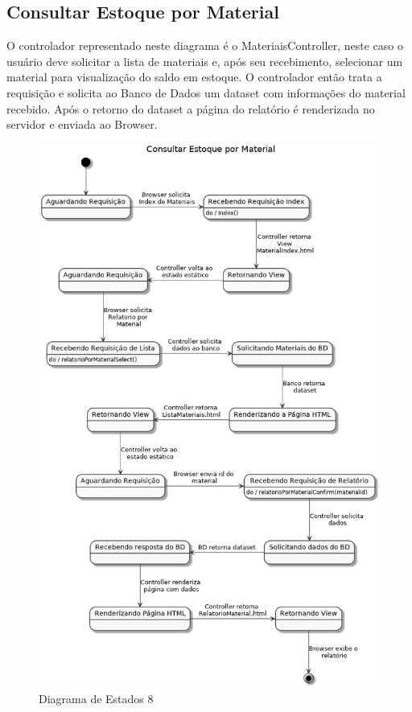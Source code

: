 \documentclass[rascunho,xindy,acronym,symbols]{fei}
\begin{document}
\subsection{Consultar Estoque por Material}

O controlador representado neste diagrama é o MateriaisController, neste caso o usuário deve solicitar a lista de materiais e, após seu recebimento, selecionar um material para visualização do saldo em estoque. O controlador então trata a requisição e solicita ao Banco de Dados um dataset com informações do material recebido. Após o retorno do dataset a página do relatório é renderizada no servidor e enviada ao Browser.

\begin{figure}[H]
    \centering
    \includegraphics[scale=0.6, width=400pt]{./Images/DE_Consultar_Estoque_Material.png}
    \caption{Diagrama de Estados 8}
    \label{fig:diag_est8}
\end{figure}
\end{document}
